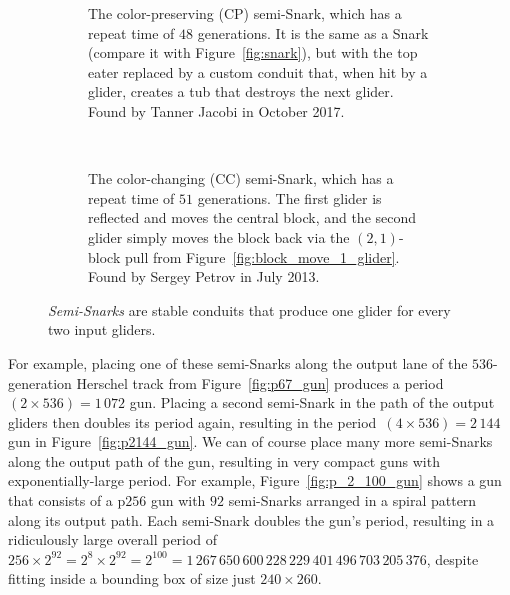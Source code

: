 \begin{figure}[!htb]
	\centering
	\begin{subfigure}{\textwidth}
		\centering
		\caption{The color-preserving (CP) semi-Snark, which has a repeat time of $48$ generations. It is the same as a Snark (compare it with Figure~\ref{fig:snark}), but with the top eater replaced by a custom conduit that, when hit by a glider, creates a tub that destroys the next glider. Found by Tanner Jacobi in October 2017. }
		\label{fig:cp_semi_snark}
	\end{subfigure} \\[0.25cm]
	\begin{subfigure}{\textwidth}
		\centering
		\caption{The color-changing (CC) semi-Snark, which has a repeat time of $51$ generations. The first glider is reflected and moves the central block, and the second glider simply moves the block back via the $(2,1)$-block pull from Figure~\ref{fig:block_move_1_glider}. Found by Sergey Petrov in July 2013.}
		\label{fig:cc_semi_snark}
	\end{subfigure}
	\caption{\emph{Semi-Snarks} are stable conduits that produce one glider for every two input gliders.}
	\label{fig:semi_snarks}
\end{figure}

For example, placing one of these semi-Snarks along the output lane of the $536$-generation Herschel track from Figure~\ref{fig:p67_gun} produces a period~$(2 \times 536)=1\, 072$ gun. Placing a second semi-Snark in the path of the output gliders then doubles its period again, resulting in the period~$(4 \times 536)=2\, 144$ gun in Figure~\ref{fig:p2144_gun}. We can of course place many more semi-Snarks along the output path of the gun, resulting in very compact guns with exponentially-large period. For example, Figure~\ref{fig:p_2_100_gun} shows a gun that consists of a p$256$ gun with $92$ semi-Snarks arranged in a spiral pattern along its output path. Each semi-Snark doubles the gun's period, resulting in a ridiculously large overall period of $256 \times 2^{92} = 2^8 \times 2^{92} = 2^{100} = 1\,267\,650\,600\,228\,229\,401\,496\,703\,205\,376$, despite fitting inside a bounding box of size just $240 \times 260$.

